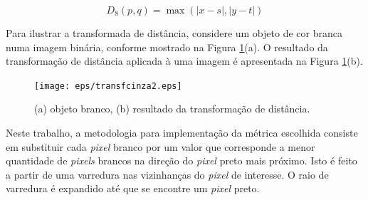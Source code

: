 
\begin{equation}
\label{eqD8}
D_8 (p,q) = \max (\left| {x - s} \right|,\left| {y - t} \right|)
\end{equation}

Para ilustrar a transformada de dist\^{a}ncia, considere um objeto de cor branca numa imagem bin\'{a}ria, conforme mostrado na Figura \ref{transfcinza}(a). O resultado da transforma\c{c}\~{a}o de dist\^{a}ncia aplicada \`{a} uma imagem \'{e} apresentada na Figura \ref{transfcinza}(b).

\begin{figure}[hbt]
\begin{center}
\texttt{[image: eps/transfcinza2.eps]}\\
\end{center}
\caption{\label{transfcinza}\hspace{-0.1em} (a) objeto branco, (b) resultado da transforma\c{c}\~{a}o de dist\^{a}ncia.}
\end{figure}

Neste trabalho, a metodologia para implementa\c{c}\~{a}o da m\'{e}trica escolhida consiste em substituir cada \textit{pixel} branco por um valor que corresponde a menor quantidade de \textit{pixels} brancos na dire\c{c}\~{a}o do \textit{pixel} preto mais pr\'{o}ximo. Isto \'{e} feito a partir de uma varredura nas vizinhan\c{c}as do \textit{pixel} de interesse. O raio de varredura \'{e} expandido at\'{e} que se encontre um \textit{pixel} preto.


